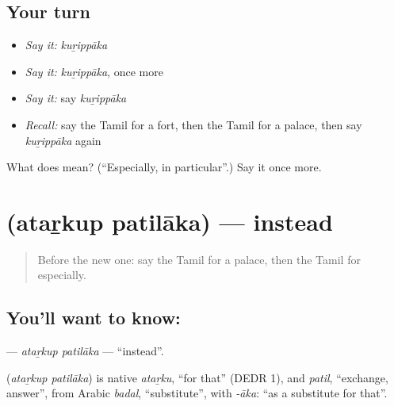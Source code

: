 \subsection*{Your turn}
\begin{itemize}
\raggedright
  \item \emph{Say it:} \emph{kuṟippāka}
  \item \emph{Say it:} \emph{kuṟippāka}, once more
  \item \emph{Say it:} say \emph{kuṟippāka}
  \item \emph{Recall:} say the Tamil for a fort, then the Tamil for a palace, then say \emph{kuṟippāka} again
\end{itemize}

\begin{tcolorbox}[breakable,colback=teal!4,colframe=teal!35!black,title={Before you move on}]
What does  mean? (\textquotedblleft{}Especially, in particular\textquotedblright{}.) Say it once more.
\end{tcolorbox}
\section[\texorpdfstring{\ta{அதற்குப்} \ta{பதிலாக} (ataṟkup patilāka)}{அதற்குப் பதிலாக (ataṟkup patilāka)}]{  (ataṟkup patilāka) — instead}

\label{lesson:TA-C237-atarkup-patilaka}



\begin{quote}
Before the new one: say the Tamil for a palace, then the Tamil for especially.
\end{quote}

\subsection*{You'll want to know:  }
\textbf{ } — \emph{ataṟkup patilāka} — \textquotedblleft{}instead\textquotedblright{}.

\begin{cousinweb}
\textbf{ } (\emph{ataṟkup patilāka}) is native \emph{ataṟku}, \textquotedblleft{}for that\textquotedblright{} (DEDR 1), and \emph{patil}, \textquotedblleft{}exchange, answer\textquotedblright{}, from Arabic \emph{badal}, \textquotedblleft{}substitute\textquotedblright{}, with \emph{-āka}: \textquotedblleft{}as a substitute for that\textquotedblright{}.
\end{cousinweb}

